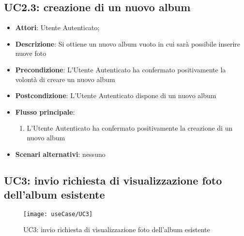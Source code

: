 
\subsection{UC2.3: creazione di un nuovo album}
\label{uc:uc2.3}

\begin{itemize}
  \item \textbf{Attori}: Utente Autenticato;
  \item \textbf{Descrizione}: Si ottiene un nuovo album vuoto in cui sarà
possibile inserire nuove foto
  \item \textbf{Precondizione}: L'Utente Autenticato ha confermato
positivamente la volontà di creare un nuovo album
  \item \textbf{Postcondizione}: L'Utente Autenticato dispone di un nuovo album
  \item \textbf{Flusso principale}:
  \begin{enumerate}
    \item L'Utente Autenticato ha confermato positivamente la creazione di un
nuovo album
  \end{enumerate}
  \item \textbf{Scenari alternativi}: nessuno
\end{itemize}


\newpage

\subsection{UC3: invio richiesta di visualizzazione foto dell'album esistente}
\label{uc:uc3}


\begin{figure}[H]
  \centering
  \texttt{[image: useCase/UC3]}
  \caption{UC3: invio richiesta di visualizzazione foto dell'album esistente}
\end{figure}

